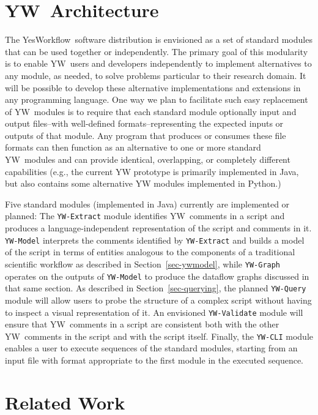 \documentclass{article}
\newcommand{\YW}{\textsf{YesWorkflow}}
\newcommand{\yw}{\textsf{YW}}
\newcommand{\ywt}{\textsf{YW}}
\newcommand{\ywm}[1]{\texttt{#1}}
\begin{document}
\section{\ywt\ Architecture}

The \YW\ software distribution is envisioned as a set of standard
modules that can be used together or independently. The primary goal
of this modularity is to enable \yw\ users and developers
independently to implement alternatives to any module, as needed, to
solve problems particular to their research domain. It will be
possible to develop these alternative implementations and extensions
in any programming language.  One way we plan to facilitate such easy
replacement of \yw\ modules is to require that each standard module
optionally input and output files--with well-defined
formats--representing the expected inputs or outputs of that
module. Any program that produces or consumes these file formats can
then function as an alternative to one or more standard \yw\ modules
and can provide identical, overlapping, or completely different
capabilities (e.g., the current \textsf{YW} prototype is primarily
implemented in Java, but also contains some alternative \textsf{YW}
modules implemented in Python.)

Five standard modules (implemented in Java) currently are implemented
or planned: The \ywm{YW-Extract} module identifies \yw\ comments in a
script and produces a language-independent representation of the
script and comments in it. \ywm{YW-Model} interprets the comments
identified by \ywm{YW-Extract} and builds a model of the script in
terms of entities analogous to the components of a traditional
scientific workflow as described in Section~\ref{sec-ywmodel}, while
\ywm{YW-Graph} operates on the outputs of \ywm{YW-Model} to produce
the dataflow graphs discussed in that same section. As described in
Section~\ref{sec-querying}, the planned \ywm{YW-Query} module will
allow users to probe the structure of a complex script without having
to inspect a visual representation of it. An envisioned
\ywm{YW-Validate} module will ensure that \yw\ comments in a script
are consistent both with the other \yw\ comments in the script and
with the script itself. Finally, the \ywm{YW-CLI} module enables a
user to execute sequences of the standard modules, starting from an
input file with format appropriate to the first module in the executed
sequence.


\section{Related Work}
\end{document}
